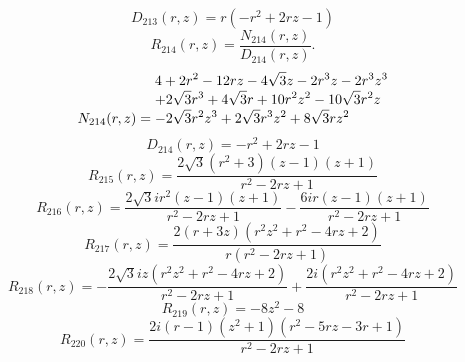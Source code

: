 \documentclass[11pt,a4paper]{article}
\begin{document}
\begin{equation}
D_{213}(r,z)=r \left(- r^{2} + 2 r z - 1\right)
\label{eq:cat-denominator-213}
\end{equation}
\begin{equation}
R_{214}(r,z)=\frac{N_{214}(r,z)}{D_{214}(r,z)}.
\label{eq:cat-rational-214}
\end{equation}
\begin{equation}
N_{214}(r,z)=\shortstack[l]{$\displaystyle 4 + 2 r^{2} - 12 r z - 4 \sqrt{3} z - 2 r^{3} z - 2 r^{3} z^{3}$\\
$\displaystyle  + 2 \sqrt{3} r^{3} + 4 \sqrt{3} r + 10 r^{2} z^{2} - 10 \sqrt{3} r^{2} z$\\
$\displaystyle  - 2 \sqrt{3} r^{2} z^{3} + 2 \sqrt{3} r^{3} z^{2} + 8 \sqrt{3} r z^{2}$}
\label{eq:cat-numerator-214}
\end{equation}
\begin{equation}
D_{214}(r,z)=- r^{2} + 2 r z - 1
\label{eq:cat-denominator-214}
\end{equation}
\begin{equation}
R_{215}(r,z)=\frac{2 \sqrt{3} \left(r^{2} + 3\right) \left(z - 1\right) \left(z + 1\right)}{r^{2} - 2 r z + 1}
\label{eq:cat-rational-215}
\end{equation}
\begin{equation}
R_{216}(r,z)=\frac{2 \sqrt{3} i r^{2} \left(z - 1\right) \left(z + 1\right)}{r^{2} - 2 r z + 1} - \frac{6 i r \left(z - 1\right) \left(z + 1\right)}{r^{2} - 2 r z + 1}
\label{eq:cat-rational-216}
\end{equation}
\begin{equation}
R_{217}(r,z)=\frac{2 \left(r + 3 z\right) \left(r^{2} z^{2} + r^{2} - 4 r z + 2\right)}{r \left(r^{2} - 2 r z + 1\right)}
\label{eq:cat-rational-217}
\end{equation}
\begin{equation}
R_{218}(r,z)=- \frac{2 \sqrt{3} i z \left(r^{2} z^{2} + r^{2} - 4 r z + 2\right)}{r^{2} - 2 r z + 1} + \frac{2 i \left(r^{2} z^{2} + r^{2} - 4 r z + 2\right)}{r^{2} - 2 r z + 1}
\label{eq:cat-rational-218}
\end{equation}
\begin{equation}
R_{219}(r,z)=- 8 z^{2} - 8
\label{eq:cat-rational-219}
\end{equation}
\begin{equation}
R_{220}(r,z)=\frac{2 i \left(r - 1\right) \left(z^{2} + 1\right) \left(r^{2} - 5 r z - 3 r + 1\right)}{r^{2} - 2 r z + 1}
\label{eq:cat-rational-220}
\end{equation}
\end{document}
